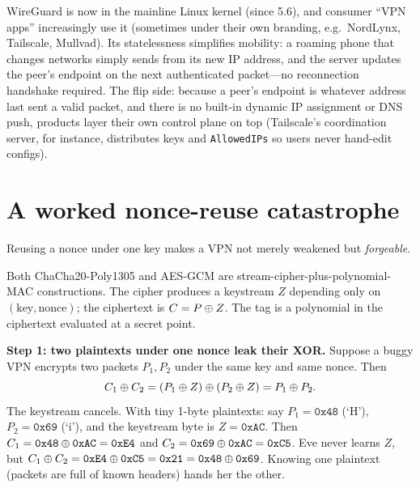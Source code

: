 \begin{applicationbox}
WireGuard is now in the mainline Linux kernel (since 5.6), and consumer ``VPN apps'' increasingly use it (sometimes under their own branding, e.g.\ NordLynx, Tailscale, Mullvad). Its statelessness simplifies mobility: a roaming phone that changes networks simply sends from its new IP address, and the server updates the peer's endpoint on the next authenticated packet---no reconnection handshake required. The flip side: because a peer's endpoint is whatever address last sent a valid packet, and there is no built-in dynamic IP assignment or DNS push, products layer their own control plane on top (Tailscale's coordination server, for instance, distributes keys and \texttt{AllowedIPs} so users never hand-edit configs).
\end{applicationbox}

\section{A worked nonce-reuse catastrophe}
\label{ch30:noncereuse}

Reusing a nonce under one key makes a VPN not merely weakened but \emph{forgeable}.

Both ChaCha20-Poly1305 and AES-GCM are stream-cipher-plus-polynomial-MAC constructions. The cipher produces a keystream \(Z\) depending only on \((\text{key}, \text{nonce})\); the ciphertext is \(C = P \oplus Z\). The tag is a polynomial in the ciphertext evaluated at a secret point.

\textbf{Step 1: two plaintexts under one nonce leak their XOR.} Suppose a buggy VPN encrypts two packets \(P_1, P_2\) under the same key and same nonce. Then
\[
C_1 \oplus C_2 = (P_1 \oplus Z)\oplus(P_2 \oplus Z) = P_1 \oplus P_2 .
\]
The keystream cancels. With tiny 1-byte plaintexts: say \(P_1 = \texttt{0x48}\) (`H'), \(P_2=\texttt{0x69}\) (`i'), and the keystream byte is \(Z=\texttt{0xAC}\). Then \(C_1 = \texttt{0x48}\oplus\texttt{0xAC}=\texttt{0xE4}\) and \(C_2=\texttt{0x69}\oplus\texttt{0xAC}=\texttt{0xC5}\). Eve never learns \(Z\), but \(C_1\oplus C_2=\texttt{0xE4}\oplus\texttt{0xC5}=\texttt{0x21}=\texttt{0x48}\oplus\texttt{0x69}\). Knowing one plaintext (packets are full of known headers) hands her the other.

